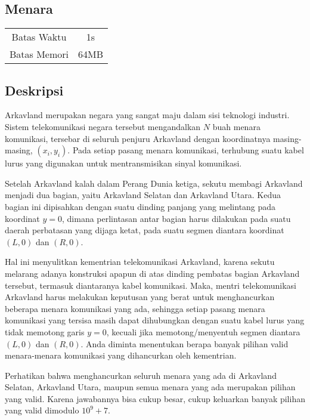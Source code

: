 \documentclass{article}
\begin{document}
\begin{center}
    \section*{Menara} %

    \begin{tabular}{ | c c | }
        \hline
        Batas Waktu  & 1s \\    %
        Batas Memori & 64MB \\  %
        \hline
    \end{tabular}
\end{center}

\subsection*{Deskripsi}

Arkavland merupakan negara yang sangat maju dalam sisi teknologi industri. Sistem telekomunikasi negara tersebut mengandalkan $N$ buah menara komunikasi, tersebar di seluruh penjuru Arkavland dengan koordinatnya masing-masing, $(x_i, y_i)$. Pada setiap pasang menara komunikasi, terhubung suatu kabel lurus yang digunakan untuk mentransmisikan sinyal komunikasi.

Setelah Arkavland kalah dalam Perang Dunia ketiga, sekutu membagi Arkavland menjadi dua bagian, yaitu Arkavland Selatan dan Arkavland Utara. Kedua bagian ini dipisahkan dengan suatu dinding panjang yang melintang pada koordinat $y = 0$, dimana perlintasan antar bagian harus dilakukan pada suatu daerah perbatasan yang dijaga ketat, pada suatu segmen diantara koordinat $(L, 0)$ dan $(R, 0)$. 

Hal ini menyulitkan kementrian telekomunikasi Arkavland, karena sekutu melarang adanya konstruksi apapun di atas dinding pembatas bagian Arkavland tersebut, termasuk diantaranya kabel komunikasi. Maka, mentri telekomunikasi Arkavland harus melakukan keputusan yang berat untuk menghancurkan beberapa menara komunikasi yang ada, sehingga setiap pasang menara komunikasi yang tersisa masih dapat dihubungkan dengan suatu kabel lurus yang tidak memotong garis $y = 0$, kecuali jika memotong/menyentuh segmen diantara $(L, 0)$ dan $(R, 0)$. Anda diminta menentukan berapa banyak pilihan valid menara-menara komunikasi yang dihancurkan oleh kementrian.

Perhatikan bahwa menghancurkan seluruh menara yang ada di Arkavland Selatan, Arkavland Utara, maupun semua menara yang ada merupakan pilihan yang valid. Karena jawabannya bisa cukup besar, cukup keluarkan banyak pilihan yang valid dimodulo $10^9 + 7$.
\end{document}

